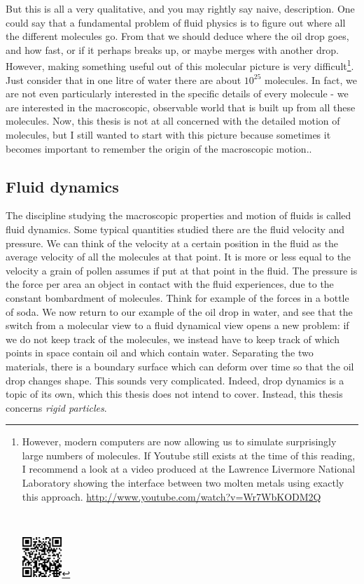 \documentclass[thesis.tex]{subfiles}
\begin{document}
But this is all a very qualitative, and you may rightly say naive, description. One could say that a fundamental problem of fluid physics is to figure out where all the different molecules go. From that we should deduce where the oil drop goes, and how fast, or if it perhaps breaks up, or maybe merges with another drop. However, making something useful out of this molecular picture is very difficult\footnote{
\begin{minipage}[l]{9cm}
However, modern computers are now allowing us to simulate surprisingly large numbers of molecules. If Youtube still exists at the time of this reading, I recommend a look at a video produced at the Lawrence Livermore National Laboratory showing the interface between two molten metals using exactly this approach. \url{http://www.youtube.com/watch?v=Wr7WbKODM2Q}
\end{minipage}\,\,
\begin{minipage}[l]{1.5cm}
\includegraphics[width=1.5cm]{figs/ninebillion_qr.png}
\end{minipage}
}.
Just consider that in one litre of water there are about $10^{25}$ molecules. In fact, we are not even particularly interested in the specific details of every molecule - we are interested in the macroscopic, observable world that is built up from all these molecules. Now, this thesis is not at all concerned with the detailed motion of molecules, but I still wanted to start with this picture because sometimes it becomes important to remember the origin of the macroscopic motion..

\subsection{Fluid dynamics}

The discipline studying the macroscopic properties and motion of fluids is called fluid dynamics. Some typical quantities studied there are the fluid velocity and pressure. We can think of the velocity at a certain position in the fluid as the average velocity of all the molecules at that point. It is more or less equal to the velocity a grain of pollen assumes if put at that point in the fluid. The pressure is the force per area an object in contact with the fluid experiences, due to the constant bombardment of molecules. Think for example of the forces in a bottle of soda. We now return to our example of the oil drop in water, and see that the switch from a molecular view to a fluid dynamical view opens a new problem: if we do not keep track of the molecules, we instead have to keep track of which points in space contain oil and which contain water. Separating the two materials, there is a boundary surface which can deform over time so that the oil drop changes shape. This sounds very complicated. Indeed, drop dynamics is a topic of its own, which this thesis does not intend to cover. Instead, this thesis concerns \emph{rigid particles}. 
\end{document}
